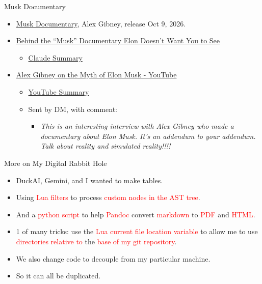 \documentclass[
  ignorenonframetext,
]{beamer}
\providecommand{\tightlist}{%
  \setlength{\itemsep}{0pt}\setlength{\parskip}{0pt}}
\newcommand{\Cred}[1]{\textcolor{red}{#1}}
\newcommand{\Cteal}[1]{\textcolor{teal!90!black}{#1}} %
\begin{document}
\begin{frame}{Musk Documentary}
\protect{}\label{musk-documentary}
\begin{itemize}
\item
  \href{https://en.wikipedia.org/wiki/Musk_(film)}{Musk Documentary},
  Alex Gibney, release Oct 9, 2026.
\item
  \href{https://www.youtube.com/watch?v=LUjirxMzFqQ}{Behind the ``Musk''
  Documentary Elon Doesn't Want You to See}

  \begin{itemize}
  \tightlist
  \item
    \href{https://seaxelrod.github.io/BOLLI-f26-tales-of-defiance/materials/thematrix/Behind_the_Musk_Documentary.html}{Claude
    Summary}
  \end{itemize}
\item
  \href{https://www.youtube.com/watch?v=XbQv0vO2Ymo}{Alex Gibney on the
  Myth of Elon Musk - YouTube}

  \begin{itemize}
  \tightlist
  \item
    \href{https://seaxelrod.github.io/BOLLI-f26-tales-of-defiance/materials/thematrix/AlexGibneyOnMusk_summary.html}{YouTube
    Summary}
  \item
    Sent by DM, with comment:

    \begin{itemize}
    \tightlist
    \item
      \emph{This is an interesting interview with Alex Gibney who made a
      documentary about Elon Musk. It's an addendum to your addendum.
      Talk about reality and simulated reality!!!!}
    \end{itemize}
  \end{itemize}
\end{itemize}
\end{frame}

\begin{frame}{More on My Digital Rabbit Hole}
\protect{}\label{more-on-my-digital-rabbit-hole}
\begin{itemize}
\item
  DuckAI, Gemini, and I wanted to make tables. \vspace*{0.3in}
\item
  Using \Cred{Lua filters} to process
  \Cred{custom nodes in the AST tree}.
\item
  And a \Cred{python script} to help \Cred{Pandoc} convert
  \Cred{markdown} to \Cred{PDF} and \Cred{HTML}.
\item
  1 of many tricks: use the \Cred{Lua current file location variable} to
  allow me to use \Cred{directories relative to} the
  \Cred{base of my git repository}.
\item
  \Cteal{We also change code to decouple from my particular machine.}
\item
  \Cteal{So it can all be duplicated.}
\end{itemize}
\end{frame}
\end{document}
